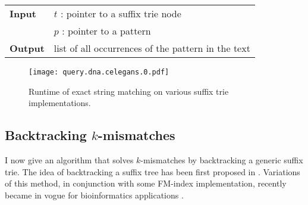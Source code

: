 \begin{figure*}[b]
\begin{center}
\begin{minipage}[t]{.7\textwidth}
\begin{algorithm}[H]
\begin{tabular}{ll}
\textbf{Input}  & $t$ : pointer to a suffix trie node\\
				& $p$ : pointer to a pattern\\
\textbf{Output} & list of all occurrences of the pattern in the text\\
\end{tabular}
\begin{algorithmic}[1]
	\State \Report {}
		\State {}
\EndIf
\end{algorithmic}
\label{alg:st-exact}
\end{algorithm}
\end{minipage}
\end{center}
\end{figure*}

\begin{figure}[t]
\begin{center}
\caption[Exact string matching runtime]{Runtime of exact string matching on various suffix trie implementations.}
\label{fig:query-dna-exact}
\texttt{[image: query.dna.celegans.0.pdf]}
\end{center}
\end{figure}

%

\subsection{Backtracking $k$-mismatches}
\label{sec:index:algo:kmismatches}

I now give an algorithm that solves $k$-mismatches by backtracking a generic suffix trie.
The idea of backtracking a suffix tree has been first proposed in \citep{Ukkonen1993}.
Variations of this method, in conjunction with some FM-index implementation, recently became in vogue for bioinformatics applications \citep{Langmead2009, Li2009}.

